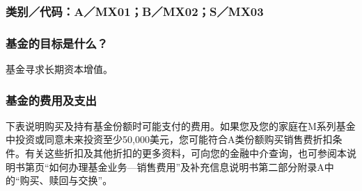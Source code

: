 \documentclass[UTF8,fontset=none,11pt,a4paper]{ctexart}
\begin{document}
\subsubsection*{类别／代码：A／MX01；B／MX02；S／MX03}
\subsubsection*{基金的目标是什么？}
基金寻求长期资本增值。

\subsubsection*{基金的费用及支出}
下表说明购买及持有基金份额时可能支付的费用。如果您及您的家庭在M系列基金中投资或同意未来投资至少50,000美元，您可能符合A类份额购买销售费折扣条件。有关这些折扣及其他折扣的更多资料，可向您的金融中介查询，也可参阅本说明书第\pageref{unitU475}页“如何办理基金业务—销售费用”及补充信息说明书第二部分附录A中的“购买、赎回与交换”。
\end{document}
